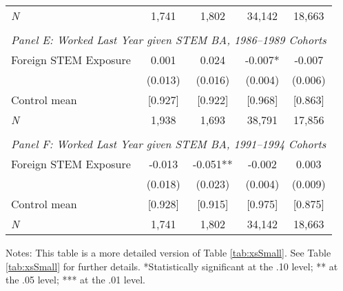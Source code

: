 \begin{table}[ht]
\begin{threeparttable}
\begin{tabular}{lcccc}
\emph{N} &      1,741 &     1,802 &    34,142 &    18,663 \\ 
&&&&\\
\multicolumn{5}{l}{\emph{Panel E: Worked Last Year given STEM BA, 1986--1989 Cohorts}}\\ 
Foreign STEM Exposure & 0.001  & 0.024  & -0.007* & -0.007  \\ 
 &  (0.013) & (0.016) & (0.004) & (0.006) \\ 
Control mean &  [0.927] & [0.922] & [0.968] & [0.863] \\ 
\emph{N} &      1,938 &     1,693 &    38,791 &    17,856 \\ 
&&&&\\
\multicolumn{5}{l}{\emph{Panel F: Worked Last Year given STEM BA, 1991--1994 Cohorts}}\\ 
Foreign STEM Exposure & -0.013  & -0.051** & -0.002  & 0.003  \\ 
 &  (0.018) & (0.023) & (0.004) & (0.009) \\ 
Control mean &  [0.928] & [0.915] & [0.975] & [0.875] \\ 
\emph{N} &      1,741 &     1,802 &    34,142 &    18,663 \\ 
\bottomrule 
\end{tabular} 
\footnotesize Notes: This table is a more detailed version of Table \ref{tab:xsSmall}. See Table \ref{tab:xsSmall} for further details. *Statistically significant at the .10 level; ** at the .05 level; *** at the .01 level.
\end{threeparttable} 
\end{table} 
